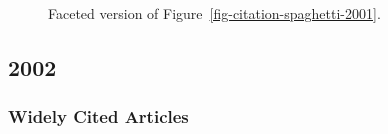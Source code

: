 \documentclass[
  10pt,
  letterpaper,
  DIV=11,
  numbers=noendperiod,
  twoside]{scrartcl}
\begin{document}
\begin{figure}


\caption{\label{fig-citation-facet-2001}Faceted version of
Figure~\ref{fig-citation-spaghetti-2001}.}

\end{figure}%

\newpage

\subsection{2002}\label{sec-s2002}

\subsubsection*{Widely Cited Articles}\label{widely-cited-articles-46}
\end{document}
